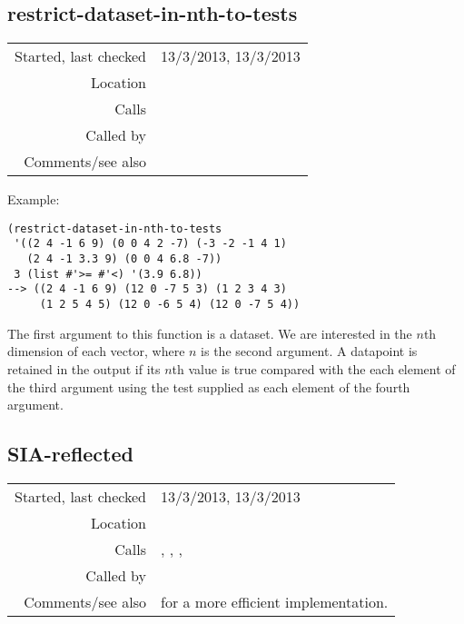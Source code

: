\subsection*{restrict-dataset-in-nth-to-tests}\label{fun:restrict-dataset-in-nth-to-tests}

\vspace{0.3cm}
\begin{tabular}{r|p{8cm}}
Started, last checked & 13/3/2013, 13/3/2013 \\
Location & \nameref{sec:structural-induction-mod} \\
Calls & \\
Called by & \\
Comments/see also &
\end{tabular}

\vspace{0.5cm}
\noindent Example:
\begin{verbatim}
(restrict-dataset-in-nth-to-tests
 '((2 4 -1 6 9) (0 0 4 2 -7) (-3 -2 -1 4 1)
   (2 4 -1 3.3 9) (0 0 4 6.8 -7))
 3 (list #'>= #'<) '(3.9 6.8))
--> ((2 4 -1 6 9) (12 0 -7 5 3) (1 2 3 4 3)
     (1 2 5 4 5) (12 0 -6 5 4) (12 0 -7 5 4))
\end{verbatim}

\noindent The first argument to this function is a
dataset. We are interested in the $n$th dimension of
each vector, where $n$ is the second argument. A
datapoint is retained in the output if its $n$th value
is true compared with the each element of the third
argument using the test supplied as each element of
the fourth argument.


\subsection*{SIA-reflected}\label{fun:SIA-reflected}

\vspace{0.3cm}
\begin{tabular}{r|p{8cm}}
Started, last checked & 13/3/2013, 13/3/2013 \\
Location & \nameref{sec:structural-induction-mod} \\
Calls & \nameref{fun:assoc-files}, \nameref{fun:subtract-two-lists}, \nameref{fun:update-written-file}, \nameref{fun:write-to-file} \\
Called by & \\
Comments/see also & \nameref{fun:SIA-reflected-merge-sort} for a more efficient implementation.
\end{tabular}

